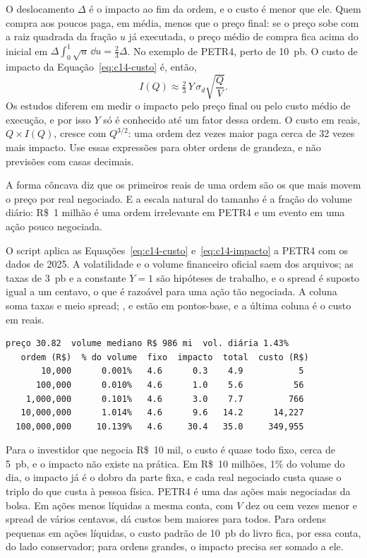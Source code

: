 O deslocamento $\Delta$ é o impacto ao fim da ordem, e o custo é menor que ele. Quem compra aos poucos paga, em média, menos que o preço final: se o preço sobe com a raiz quadrada da fração $u$ já executada, o preço médio de compra fica acima do inicial em $\Delta \int_0^1 \sqrt{u}\,\dd u = \tfrac{2}{3}\Delta$. No exemplo de PETR4, perto de 10~pb. O custo de impacto da Equação~\eqref{eq:c14-custo} é, então,
\begin{equation}
  I(Q) \approx \tfrac{2}{3}\, Y \, \sigma_d \sqrt{\frac{Q}{V}} .
  \label{eq:c14-impacto}
\end{equation}
Os estudos diferem em medir o impacto pelo preço final ou pelo custo médio de execução, e por isso $Y$ só é conhecido até um fator dessa ordem. O custo em reais, $Q \times I(Q)$, cresce com $Q^{3/2}$: uma ordem dez vezes maior paga cerca de 32 vezes mais impacto. Use essas expressões para obter ordens de grandeza, e não previsões com casas decimais.

\begin{intuicao}
A forma côncava diz que os primeiros reais de uma ordem são os que mais movem o preço por real negociado. E a escala natural do tamanho é a fração do volume diário: R\$~1 milhão é uma ordem irrelevante em PETR4 e um evento em uma ação pouco negociada.
\end{intuicao}

O script  aplica as Equações~\eqref{eq:c14-custo} e~\eqref{eq:c14-impacto} a PETR4 com os dados de 2025. A volatilidade e o volume financeiro oficial saem dos arquivos; as taxas de 3~pb e a constante $Y = 1$ são hipóteses de trabalho, e o spread é suposto igual a um centavo, o que é razoável para uma ação tão negociada. A coluna  soma taxas e meio spread; ,  e  estão em pontos-base, e a última coluna é o custo em reais.

\begin{lstlisting}[style=saida]
preço 30.82  volume mediano R$ 986 mi  vol. diária 1.43%
   ordem (R$)  % do volume  fixo  impacto  total  custo (R$)
       10,000      0.001%   4.6      0.3    4.9           5
      100,000      0.010%   4.6      1.0    5.6          56
    1,000,000      0.101%   4.6      3.0    7.7         766
   10,000,000      1.014%   4.6      9.6   14.2      14,227
  100,000,000     10.139%   4.6     30.4   35.0     349,955
\end{lstlisting}

Para o investidor que negocia R\$~10 mil, o custo é quase todo fixo, cerca de 5~pb, e o impacto não existe na prática. Em R\$~10 milhões, 1\% do volume do dia, o impacto já é o dobro da parte fixa, e cada real negociado custa quase o triplo do que custa à pessoa física. PETR4 é uma das ações mais negociadas da bolsa. Em ações menos líquidas a mesma conta, com $V$ dez ou cem vezes menor e spread de vários centavos, dá custos bem maiores para todos. Para ordens pequenas em ações líquidas, o custo padrão de 10~pb do livro fica, por essa conta, do lado conservador; para ordens grandes, o impacto precisa ser somado a ele.

